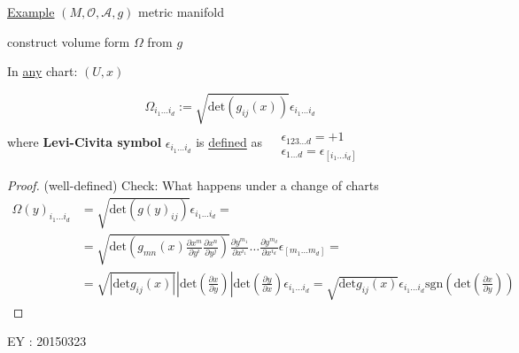 	\underline{Example} $(M,\mathcal{O}, \mathcal{A},g)$ metric manifold
	
	construct volume form $\Omega$ from $g$
	
	In \underline{any} chart: $(U,x)$
	
	\[
	\Omega_{i_1 \dots i_d} := \sqrt{ \text{det}(g_{ij}(x)) } \epsilon_{i_1 \dots i_d} 
	\]
	where \textbf{Levi-Civita symbol} $\epsilon_{i_1 \dots i_d}$ is \underline{defined} as $\begin{aligned} & \quad \\ 
	& \epsilon_{123 \dots d} = +1 \\ 
	& \epsilon_{1\dots d} = \epsilon_{[i_1 \dots i_d]} \end{aligned}$
	
	\begin{proof} (well-defined) Check: What happens under a change of charts
		\[
		\begin{aligned}
		\Omega(y)_{i_1 \dots i_d} & = \sqrt{ \text{det}(g(y)_{ij}) } \epsilon_{i_1 \dots i_d} = \\
		& = \sqrt{ \text{det}(g_{mn}(x) \frac{ \partial x^m}{ \partial y^i} \frac{ \partial x^n}{ \partial y^j} )} \frac{ \partial y^{m_1} }{ \partial x^{i_1} } \dots \frac{ \partial y^{m_d}}{ \partial x^{i_d}} \epsilon_{ [m_1 \dots m_d] } = \\
		& = \sqrt{ | \text{det}g_{ij}(x) | } \left| \text{det}\left( \frac{ \partial x}{ \partial y} \right) \right| \text{det}\left( \frac{ \partial y}{ \partial x} \right) \epsilon_{i_1 \dots i_d} = \sqrt{ \text{det}g_{ij}(x)} \epsilon_{i_1 \dots i_d} \text{sgn}\left( \text{det}\left( \frac{ \partial x}{ \partial y} \right) \right)
		\end{aligned}
		\]
	\end{proof}
	
	EY : 20150323 
	
